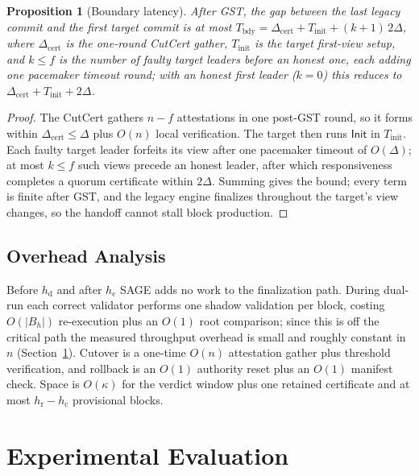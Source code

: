 \documentclass[journal]{IEEEtran}
\newtheorem{proposition}{Proposition}
\theoremstyle{remark}
\begin{document}
\begin{proposition}[Boundary latency]
\label{prop:bdy}
After GST, the gap between the last legacy commit and the first target commit is at most
$T_{\mathrm{bdy}} = \Delta_{\mathrm{cert}} + T_{\mathrm{init}} + (k{+}1)\,2\Delta$, where
$\Delta_{\mathrm{cert}}$ is the one-round CutCert gather, $T_{\mathrm{init}}$ is the target
first-view setup, and $k\le f$ is the number of faulty target leaders before an honest one,
each adding one pacemaker timeout round; with an honest first leader ($k{=}0$) this reduces to
$\Delta_{\mathrm{cert}} + T_{\mathrm{init}} + 2\Delta$.
\end{proposition}
\begin{proof}
The CutCert gathers $n-f$ attestations in one post-GST round, so it forms within
$\Delta_{\mathrm{cert}}\le\Delta$ plus $O(n)$ local verification. The target then runs
$\mathsf{Init}$ in $T_{\mathrm{init}}$. Each faulty target leader forfeits its view after one
pacemaker timeout of $O(\Delta)$; at most $k\le f$ such views precede an honest leader, after
which responsiveness completes a quorum certificate within $2\Delta$. Summing gives the bound;
every term is finite after GST, and the legacy engine finalizes throughout the target's view
changes, so the handoff cannot stall block production.
\end{proof}

\subsection{Overhead Analysis}
Before $h_{\mathrm{d}}$ and after $h_{\mathrm{c}}$ SAGE adds no work to the finalization path.
During dual-run each correct validator performs one shadow validation per block, costing
$O(|B_h|)$ re-execution plus an $O(1)$ root comparison; since this is off the critical path the
measured throughput overhead is small and roughly constant in $n$ (Section~\ref{sec:eval}).
Cutover is a one-time $O(n)$ attestation gather plus threshold verification, and rollback is an
$O(1)$ authority reset plus an $O(1)$ manifest check. Space is $O(\kappa)$ for the verdict window
plus one retained certificate and at most $h_{\mathrm{r}}-h_{\mathrm{c}}$ provisional blocks.

\section{Experimental Evaluation}
\label{sec:eval}
\end{document}
